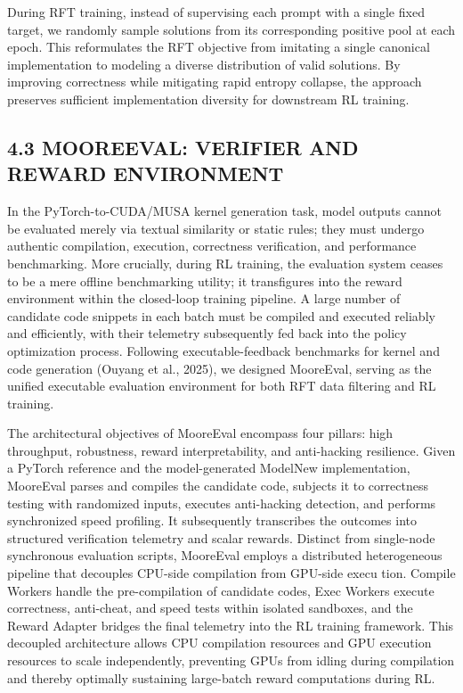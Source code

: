 \documentclass[
  10
]{article}
\begin{document}
During RFT training, instead of supervising each prompt with a single
fixed target, we randomly sample solutions from its corresponding
positive pool at each epoch. This reformulates the RFT objective from
imitating a single canonical implementation to modeling a diverse
distribution of valid solutions. By improving correctness while
mitigating rapid entropy collapse, the approach preserves sufficient
implementation diversity for downstream RL training.

\subsection{4.3 MOOREEVAL: VERIFIER AND REWARD
ENVIRONMENT}\label{mooreeval-verifier-and-reward-environment}

In the PyTorch-to-CUDA/MUSA kernel generation task, model outputs cannot
be evaluated merely via textual similarity or static rules; they must
undergo authentic compilation, execution, correctness verification, and
performance benchmarking. More crucially, during RL training, the
evaluation system ceases to be a mere offline benchmarking utility; it
transfigures into the reward environment within the closed-loop training
pipeline. A large number of candidate code snippets in each batch must
be compiled and executed reliably and efficiently, with their telemetry
subsequently fed back into the policy optimization process. Following
executable-feedback benchmarks for kernel and code generation (Ouyang et
al., 2025), we designed MooreEval, serving as the unified executable
evaluation environment for both RFT data filtering and RL training.

The architectural objectives of MooreEval encompass four pillars: high
throughput, robustness, reward interpretability, and anti-hacking
resilience. Given a PyTorch reference and the model-generated ModelNew
implementation, MooreEval parses and compiles the candidate code,
subjects it to correctness testing with randomized inputs, executes
anti-hacking detection, and performs synchronized speed profiling. It
subsequently transcribes the outcomes into structured verification
telemetry and scalar rewards. Distinct from single-node synchronous
evaluation scripts, MooreEval employs a distributed heterogeneous
pipeline that decouples CPU-side compilation from GPU-side execu tion.
Compile Workers handle the pre-compilation of candidate codes, Exec
Workers execute correctness, anti-cheat, and speed tests within isolated
sandboxes, and the Reward Adapter bridges the final telemetry into the
RL training framework. This decoupled architecture allows CPU
compilation resources and GPU execution resources to scale
independently, preventing GPUs from idling during compilation and
thereby optimally sustaining large-batch reward computations during RL.
\end{document}
